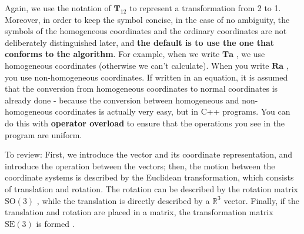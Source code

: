 Again, we use the notation of $ \bm{T}_{12} $ to represent a transformation from 2 to 1. Moreover, in order to keep the symbol concise, in the case of no ambiguity, the symbols of the homogeneous coordinates and the ordinary coordinates are not deliberately distinguished later, and \textbf{the default is to use the one that conforms to the algorithm}. For example, when we write $ \bm {T} \bm{a} $ , we use homogeneous coordinates (otherwise we can't calculate). When you write $ \bm{Ra} $ , you use non-homogeneous coordinates. If written in an equation, it is assumed that the conversion from homogeneous coordinates to normal coordinates is already done - because the conversion between homogeneous and non-homogeneous coordinates is actually very easy, but in C++ programs. You can do this with \textbf{operator overload} to ensure that the operations you see in the program are uniform.

To review: First, we introduce the vector and its coordinate representation, and introduce the operation between the vectors; then, the motion between the coordinate systems is described by the Euclidean transformation, which consists of translation and rotation. The rotation can be described by the rotation matrix $ \mathrm{SO}( 3 ) $ , while the translation is directly described by a $ \mathbb{R}^ 3 $ vector. Finally, if the translation and rotation are placed in a matrix, the transformation matrix $ \mathrm{SE}( 3 ) $ is formed .
